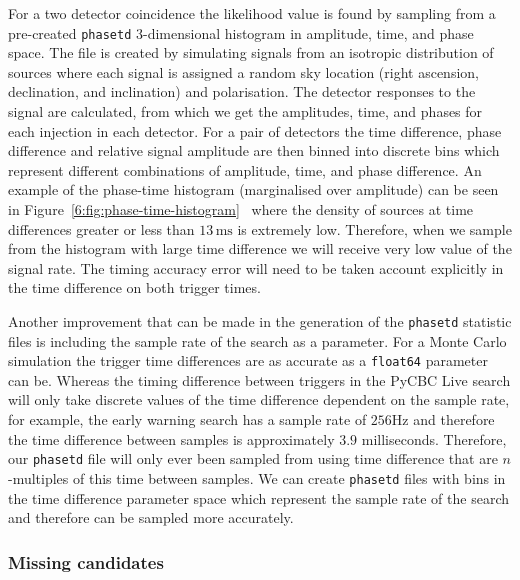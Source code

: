 For a two detector coincidence the likelihood value is found by sampling from a pre-created \texttt{phasetd} 3-dimensional histogram in amplitude, time, and phase space. The file is created by simulating \gwadj signals from an isotropic distribution of sources where each signal is assigned a random sky location (right ascension, declination, and inclination) and polarisation. The detector responses to the signal are calculated, from which we get the amplitudes, time, and phases for each injection in each detector. For a pair of detectors the time difference, phase difference and relative signal amplitude are then binned into discrete bins which represent different combinations of amplitude, time, and phase difference. An example of the phase-time histogram (marginalised over amplitude) can be seen in Figure~\ref{6:fig:phase-time-histogram}~\cite{PyCBC:2017} where the density of sources at time differences greater or less than $13 \, \text{ms}$ is extremely low. Therefore, when we sample from the histogram with large time difference we will receive very low value of the signal rate. The timing accuracy error will need to be taken account explicitly in the time difference on both trigger times.

Another improvement that can be made in the generation of the \texttt{phasetd} statistic files is including the sample rate of the search as a parameter. For a Monte Carlo simulation the trigger time differences are as accurate as a \texttt{float64} parameter can be. Whereas the timing difference between triggers in the PyCBC Live search will only take discrete values of the time difference dependent on the sample rate, for example, the early warning search has a sample rate of $256$Hz and therefore the time difference between samples is approximately $3.9$ milliseconds. Therefore, our \texttt{phasetd} file will only ever been sampled from using time difference that are $n$-multiples of this time between samples. We can create \texttt{phasetd} files with bins in the time difference parameter space which represent the sample rate of the search and therefore can be sampled more accurately.

\subsubsection{\label{6:sec:missing-cands}Missing candidates}

